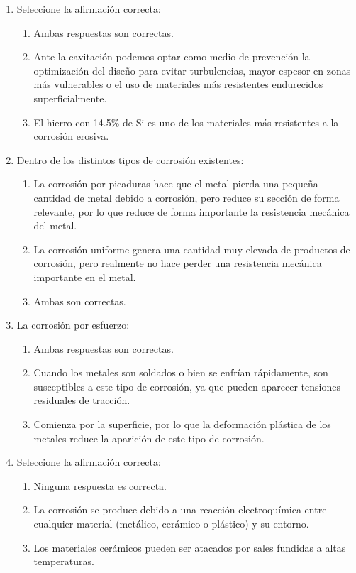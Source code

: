 \begin{enumerate}
    \item Seleccione la afirmación correcta:
          \begin{enumerate}[label=\alph*.]
              \item \textcolor{red!85!black}{Ambas respuestas son correctas.}
              \item Ante la cavitación podemos optar como medio de prevención la optimización del diseño para evitar turbulencias, mayor espesor en zonas más vulnerables o el uso de materiales más resistentes endurecidos superficialmente.
              \item El hierro con 14.5\% de Si es uno de los materiales más resistentes a la corrosión erosiva.
          \end{enumerate}

    \item Dentro de los distintos tipos de corrosión existentes:
          \begin{enumerate}[label=\alph*.]
              \item La corrosión por picaduras hace que el metal pierda una pequeña cantidad de metal debido a corrosión, pero reduce su sección de forma relevante, por lo que reduce de forma importante la resistencia mecánica del metal.
              \item La corrosión uniforme genera una cantidad muy elevada de productos de corrosión, pero realmente no hace perder una resistencia mecánica importante en el metal.
              \item \textcolor{red!85!black}{Ambas son correctas.}
          \end{enumerate}

    \item La corrosión por esfuerzo:
          \begin{enumerate}[label=\alph*.]
              \item \textcolor{red!85!black}{Ambas respuestas son correctas.}
              \item Cuando los metales son soldados o bien se enfrían rápidamente, son susceptibles a este tipo de corrosión, ya que pueden aparecer tensiones residuales de tracción.
              \item Comienza por la superficie, por lo que la deformación plástica de los metales reduce la aparición de este tipo de corrosión.
          \end{enumerate}

    \item Seleccione la afirmación correcta:
          \begin{enumerate}[label=\alph*.]
              \item Ninguna respuesta es correcta.
              \item La corrosión se produce debido a una reacción electroquímica entre cualquier material (metálico, cerámico o plástico) y su entorno.
              \item \textcolor{red!85!black}{Los materiales cerámicos pueden ser atacados por sales fundidas a altas temperaturas.}
          \end{enumerate}


\end{enumerate}
